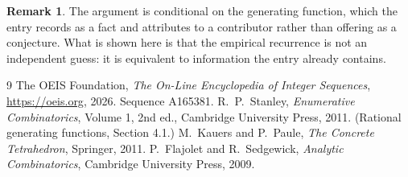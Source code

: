 \documentclass[11pt,a4paper]{article}
\theoremstyle{plain}
\theoremstyle{definition}
\newtheorem{remark}[theorem]{Remark}
\begin{document}
\begin{remark}
The argument is conditional on the generating function, which the entry records as a fact and
attributes to a contributor rather than offering as a conjecture. What is shown here is that
the empirical recurrence is not an independent guess: it is equivalent to information the
entry already contains.
\end{remark}

\begin{thebibliography}{9}
 The OEIS Foundation, \emph{The On-Line Encyclopedia of Integer
Sequences}, \url{https://oeis.org}, 2026. Sequence A165381.
 R.~P.~Stanley, \emph{Enumerative Combinatorics}, Volume 1, 2nd ed.,
Cambridge University Press, 2011. (Rational generating functions, Section 4.1.)
 M.~Kauers and P.~Paule, \emph{The Concrete Tetrahedron}, Springer, 2011.
 P.~Flajolet and R.~Sedgewick, \emph{Analytic Combinatorics}, Cambridge
University Press, 2009.
\end{thebibliography}
\end{document}
